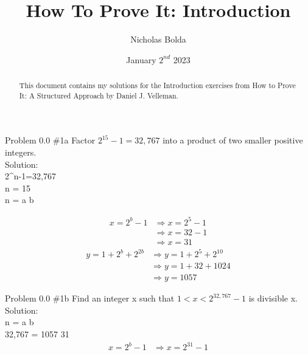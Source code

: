 \documentclass[12pt]{article}
\title{How To Prove It: Introduction}
\author{Nicholas Bolda}
\date{January \(2^{nd}\) 2023}
\begin{document}
\markboth{\theauthor}{\thetitle}
\maketitle

\begin{abstract}
    This document contains my solutions for the Introduction exercises from How to Prove It: A Structured Approach by Daniel J. Velleman.
\end{abstract}

\begin{problem}{Problem 0.0 \#1a}
    Factor \(2^{15} - 1=32,767\) into a product of two smaller positive integers.\\
    
    Solution:\\
        2^n-1=32,767\\
        n = 15\\
        n = a \boldsymbol{\cdot} b
        
    \begin{align}
        x = 2^b-1 
        &\Rightarrow x = 2^5-1 \\
        &\Rightarrow x = 32 - 1\\
        &\Rightarrow x = 31
    \end{align}
    \setcounter{equation}{0}
    \begin{align}
        y = 1+2^b+2^{2b}
        &\Rightarrow y = 1+2^5+2^{10}\\
        &\Rightarrow y = 1+32+1024\\
        &\Rightarrow y = 1057
    \end{align}
    \setcounter{equation}{0}
\end{problem}

\begin{problem}{Problem 0.0 \#1b}
    Find an integer x such that \(1 < x < 2^{32,767}-1\) is divisible x.\\

    Solution:\\
        n = a \boldsymbol{\cdot} b\\
        32,767 = 1057 \boldsymbol{\cdot} 31
    \begin{align}
        x = 2^b-1
        &\Rightarrow x = 2^{31}-1
    \end{align}
\end{problem}
\end{document}

